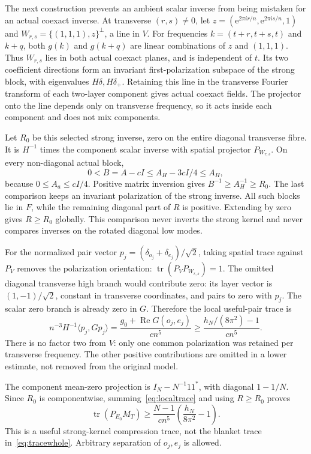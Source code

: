 \documentclass[11pt]{article}
\newcommand{\ip}[2]{\langle#1,#2\rangle}
\newcommand{\e}{\mathrm e}
\DeclareMathOperator{\tr}{tr}
\DeclareMathOperator{\Rea}{Re}
\theoremstyle{definition}
\theoremstyle{remark}
\begin{document}
The next construction prevents an ambient scalar inverse from being
mistaken for an actual coexact inverse. At transverse $(r,s)\ne0$, let
$z=(\e^{2\pi ir/n},\e^{2\pi is/n},1)$ and
$W_{r,s}=\{(1,1,1),z\}^\perp$, a line in $V$. For frequencies
$k=(t+r,t+s,t)$ and $k+q$, both $g(k)$ and $g(k+q)$ are linear combinations
of $z$ and $(1,1,1)$. Thus $W_{r,s}$ lies in both actual coexact planes,
and is independent of $t$. Its two coefficient directions form an invariant
first-polarization subspace of the strong block, with eigenvalues
$H\delta,H\delta_+$. Retaining this line in the transverse Fourier
transform of each two-layer component gives actual coexact fields. The
projector onto the line depends only on transverse frequency, so it acts
inside each component and does not mix components.

Let $R_0$ be this selected strong inverse, zero on the entire diagonal
transverse fibre. It is $H^{-1}$ times the component scalar inverse with
spatial projector $P_{W_{r,s}}$. On every non-diagonal actual block,
\[
           0<B=A-cI\le A_H-3cI/4\le A_H,
\]
because $0\le A_a\le cI/4$. Positive matrix inversion gives
$B^{-1}\ge A_H^{-1}\ge R_0$. The last comparison keeps an invariant
polarization of the strong inverse. All such blocks lie in $F$, while
the remaining diagonal part of $R$ is positive. Extending by zero gives
$R\ge R_0$ globally. This comparison never inverts the strong kernel and
never compares inverses on the rotated diagonal low modes.

For the normalized pair vector
$p_j=(\delta_{o_j}+\delta_{e_j})/\sqrt2$, taking spatial trace against
$P_V$ removes the polarization orientation:
$\tr(P_VP_{W_{r,s}})=1$. The omitted diagonal transverse high branch
would contribute zero: its layer vector is $(1,-1)/\sqrt2$, constant in
transverse coordinates, and pairs to zero with $p_j$. The scalar zero
branch is already zero in $G$. Therefore the local useful-pair trace is
\begin{equation}\label{eq:localtrace}
 n^{-3}H^{-1}\ip{p_j}{Gp_j}
   =\frac{g_0+\Rea G(o_j,e_j)}{cn^5}
   \ge\frac{h_N/(8\pi^2)-1}{cn^5}.
\end{equation}
There is no factor two from $V$: only one common polarization was retained
per transverse frequency. The other positive contributions are omitted in
a lower estimate, not removed from the original model.

The component mean-zero projection is $I_N-N^{-1}11^*$, with diagonal
$1-1/N$. Since $R_0$ is componentwise, summing~\eqref{eq:localtrace}
and using $R\ge R_0$ proves
\begin{equation}\label{eq:strongtrace}
 \tr(P_{E_0}M_T)\ge\frac{N-1}{cn^5}
                            \left(\frac{h_N}{8\pi^2}-1\right).
\end{equation}
This is a useful strong-kernel compression trace, not the blanket trace
in~\eqref{eq:tracewhole}. Arbitrary separation of $o_j,e_j$ is allowed.
\end{document}
